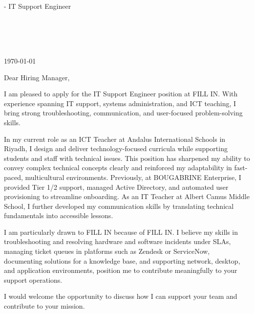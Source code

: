 \documentclass[11pt,a4paper]{article}
\providecommand{\CompanyName}{FILL IN\xspace}
\providecommand{\HiringManager}{Hiring Manager\xspace}
\providecommand{\YourMotivation}{FILL IN\xspace}
\newcommand{\JobTitle}{IT Support Engineer\xspace}
\providecommand{\JobKeywords}{troubleshooting and resolving hardware and software incidents under SLAs, managing ticket queues in platforms such as Zendesk or ServiceNow, documenting solutions for a knowledge base, and supporting network, desktop, and application environments\xspace}
\begin{document}
\begin{flushright}
    {\textbf{\FullName}} - \JobTitle \\
    \Phone \\
    \href{mailto:\Email}{\Email} \\
    \Location \\
    \LinkedIn \\
    \GitHub
\end{flushright}
\vspace{1em}
\today
\vspace{2em}


Dear \HiringManager,

I am pleased to apply for the \JobTitle position at \CompanyName. With experience spanning IT support, systems administration, and ICT teaching, I bring strong troubleshooting, communication, and user-focused problem-solving skills.

In my current role as an ICT Teacher at Andalus International Schools in Riyadh, I design and deliver technology-focused curricula while supporting students and staff with technical issues. This position has sharpened my ability to convey complex technical concepts clearly and reinforced my adaptability in fast-paced, multicultural environments. Previously, at BOUGABRINE Enterprise, I provided Tier 1/2 support, managed Active Directory, and automated user provisioning to streamline onboarding. As an IT Teacher at Albert Camus Middle School, I further developed my communication skills by translating technical fundamentals into accessible lessons.

I am particularly drawn to \CompanyName because of \YourMotivation. I believe my skills in \JobKeywords, position me to contribute meaningfully to your support operations.

I would welcome the opportunity to discuss how I can support your team and contribute to your mission.

\vspace{2em}
\Signature
\end{document}
